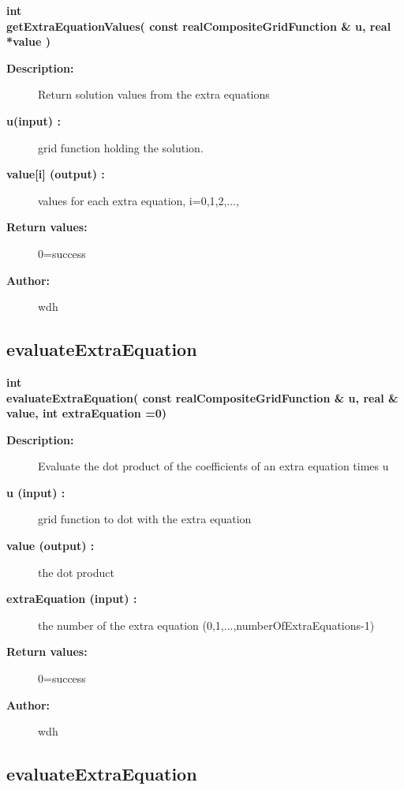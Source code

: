 \begin{flushleft} \textbf{%
int  \\ 
\settowidth{\OgesIncludeArgIndent}{getExtraEquationValues(}%
getExtraEquationValues( const realCompositeGridFunction \& u, real *value )
}\end{flushleft}
\begin{description}
\item[{\bf Description:}] 
   Return solution values from the extra equations

\item[{\bf u(input) :}]  grid function holding the solution.
\item[{\bf value[i] (output) :}]  values for each extra equation, i=0,1,2,...,
 
\item[{\bf Return values:}]  0=success
\item[{\bf Author:}]  wdh
\end{description}
\subsection{evaluateExtraEquation}
 
\begin{flushleft} \textbf{%
int  \\ 
\settowidth{\OgesIncludeArgIndent}{evaluateExtraEquation(}%
evaluateExtraEquation( const realCompositeGridFunction \& u, real \& value, int extraEquation  =0)
}\end{flushleft}
\begin{description}
\item[{\bf Description:}] 
    Evaluate the dot product of the coefficients of an extra equation times u 

\item[{\bf u (input) :}]  grid function to dot with the extra equation
\item[{\bf value (output) :}]  the dot product
\item[{\bf extraEquation (input) :}]  the number of the extra equation (0,1,...,numberOfExtraEquations-1)
 
\item[{\bf Return values:}]  0=success
\item[{\bf Author:}]  wdh
\end{description}
\subsection{evaluateExtraEquation}
 
